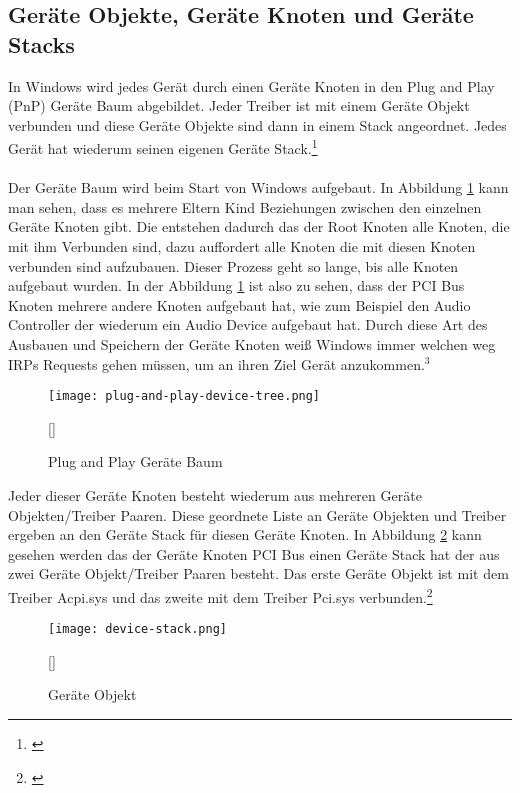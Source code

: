 \subsection{Geräte Objekte, Geräte Knoten und Geräte Stacks}
In Windows wird jedes Gerät durch einen Geräte Knoten in den Plug and Play (PnP) Geräte Baum abgebildet. Jeder Treiber ist mit einem Geräte Objekt verbunden und diese Geräte Objekte sind dann in einem Stack angeordnet. Jedes Gerät hat wiederum seinen eigenen Geräte Stack.\footnote[4]{\cite[Vgl.][]{24}}
\\\\
Der Geräte Baum wird beim Start von Windows aufgebaut. In Abbildung \ref{windows-plug-and-play-tree} kann man sehen, dass es mehrere Eltern Kind Beziehungen zwischen den einzelnen Geräte Knoten gibt. Die entstehen dadurch das der Root Knoten alle Knoten, die mit ihm Verbunden sind, dazu auffordert alle Knoten die mit diesen Knoten verbunden sind aufzubauen. Dieser Prozess geht so lange, bis alle Knoten aufgebaut wurden. In der Abbildung \ref{windows-plug-and-play-tree} ist also zu sehen, dass der PCI Bus Knoten mehrere andere Knoten aufgebaut hat, wie zum Beispiel den Audio Controller der wiederum ein Audio Device aufgebaut hat. Durch diese Art des Ausbauen und Speichern der Geräte Knoten weiß Windows immer welchen weg IRPs Requests gehen müssen, um an ihren Ziel Gerät anzukommen.$^{3}$
\newpage
\begin{figure}[H]
    \centering
    \texttt{[image: plug-and-play-device-tree.png]}
    \caption[Plug and Play Geräte Baum]{Plug and Play Geräte Baum}[\cite{24}]
    \label{windows-plug-and-play-tree} 
\end{figure}
\noindent
Jeder dieser Geräte Knoten besteht wiederum aus mehreren Geräte Objekten/Treiber Paaren. Diese geordnete Liste an Geräte Objekten und Treiber ergeben an den Geräte Stack für diesen Geräte Knoten. In Abbildung \ref{windows-device-object} kann gesehen werden das der Geräte Knoten PCI Bus einen Geräte Stack hat der aus zwei Geräte Objekt/Treiber Paaren besteht. Das erste Geräte Objekt ist mit dem Treiber Acpi.sys und das zweite mit dem Treiber Pci.sys verbunden.\footnote[1]{\cite[Vgl.][]{24}}
\begin{figure}[H]
    \centering
    \texttt{[image: device-stack.png]}
    \caption[Geräte Objekt]{Geräte Objekt}[\cite{24}]
    \label{windows-device-object}
\end{figure}
\noindent

\newpage

